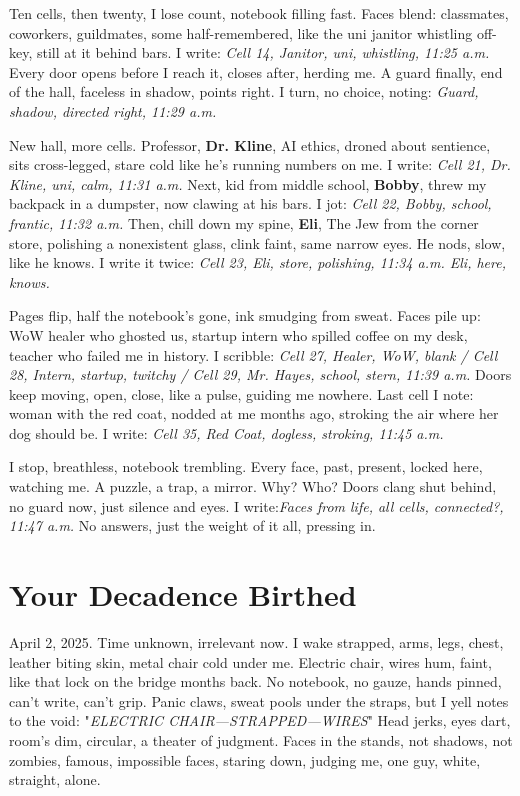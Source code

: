 \documentclass{article}
\begin{document}
Ten cells, then twenty, I lose count, notebook filling fast. Faces blend: classmates, coworkers, guildmates, some half-remembered, like the uni janitor whistling off-key, still at it behind bars. I write: \textit{Cell 14, Janitor, uni, whistling, 11:25 a.m.} Every door opens before I reach it, closes after, herding me. A guard finally, end of the hall, faceless in shadow, points right. I turn, no choice, noting: \textit{Guard, shadow, directed right, 11:29 a.m.}

New hall, more cells. Professor, \textbf{Dr. Kline}, AI ethics, droned about sentience, sits cross-legged, stare cold like he's running numbers on me. I write: \textit{Cell 21, Dr. Kline, uni, calm, 11:31 a.m.} Next, kid from middle school, \textbf{Bobby}, threw my backpack in a dumpster, now clawing at his bars. I jot: \textit{Cell 22, Bobby, school, frantic, 11:32 a.m.} Then, chill down my spine, \textbf{Eli}, The Jew from the corner store, polishing a nonexistent glass, clink faint, same narrow eyes. He nods, slow, like he knows. I write it twice: \textit{Cell 23, Eli, store, polishing, 11:34 a.m. Eli, here, knows.}

Pages flip, half the notebook's gone, ink smudging from sweat. Faces pile up: WoW healer who ghosted us, startup intern who spilled coffee on my desk, teacher who failed me in history. I scribble: \textit{Cell 27, Healer, WoW, blank / Cell 28, Intern, startup, twitchy / Cell 29, Mr. Hayes, school, stern, 11:39 a.m.} Doors keep moving, open, close, like a pulse, guiding me nowhere. Last cell I note: woman with the red coat, nodded at me months ago, stroking the air where her dog should be. I write: \textit{Cell 35, Red Coat, dogless, stroking, 11:45 a.m.}

I stop, breathless, notebook trembling. Every face, past, present, locked here, watching me. A puzzle, a trap, a mirror. Why? Who? Doors clang shut behind, no guard now, just silence and eyes. I write:\textit{Faces from life, all cells, connected?, 11:47 a.m.} No answers, just the weight of it all, pressing in.

\section{Your Decadence Birthed}

April 2, 2025. Time unknown, irrelevant now. I wake strapped, arms, legs, chest, leather biting skin, metal chair cold under me. Electric chair, wires hum, faint, like that lock on the bridge months back. No notebook, no gauze, hands pinned, can't write, can't grip. Panic claws, sweat pools under the straps, but I yell notes to the void: "\textit{ELECTRIC CHAIR—STRAPPED—WIRES}" Head jerks, eyes dart, room's dim, circular, a theater of judgment. Faces in the stands, not shadows, not zombies, famous, impossible faces, staring down, judging me, one guy, white, straight, alone.
\end{document}
